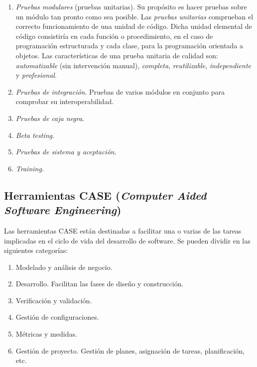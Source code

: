 \begin{enumerate}
\item \emph{Pruebas modulares} (pruebas unitarias). Su propósito es hacer pruebas sobre un módulo tan pronto como sea posible. Las \emph{pruebas unitarias} comprueban el correcto funcionamiento de una unidad de código. Dicha unidad elemental de código consistiría en cada función o procedimiento, en el caso de programación estructurada y cada clase, para la programación orientada a objetos. Las características de una prueba unitaria de calidad son: \emph{automatizable} (sin intervención manual), \emph{completa},  \emph{reutilizable}, \emph{independiente} y \emph{profesional}.

\item \emph{Pruebas de integración}. Pruebas de varios módulos en conjunto para comprobar su interoperabilidad.

\item \emph{Pruebas de caja negra}.

\item \emph{Beta testing}.

\item \emph{Pruebas de sistema y aceptación}.

\item \emph{Training}.
\end{enumerate}






\subsection{Herramientas CASE (\emph{Computer Aided Software Engineering})}

Las herramientas CASE están destinadas a facilitar una o varias 
de las tareas implicadas en el ciclo de vida del desarrollo de software. Se 
pueden dividir en las siguientes categorías:

\begin{enumerate}
\item Modelado y análisis de negocio.
\item Desarrollo. Facilitan las fases de diseño y construcción.
\item Verificación y validación.
\item Gestión de configuraciones.
\item Métricas y medidas.
\item Gestión de proyecto. Gestión de planes, asignación de tareas, planificación, etc.
\end{enumerate}




